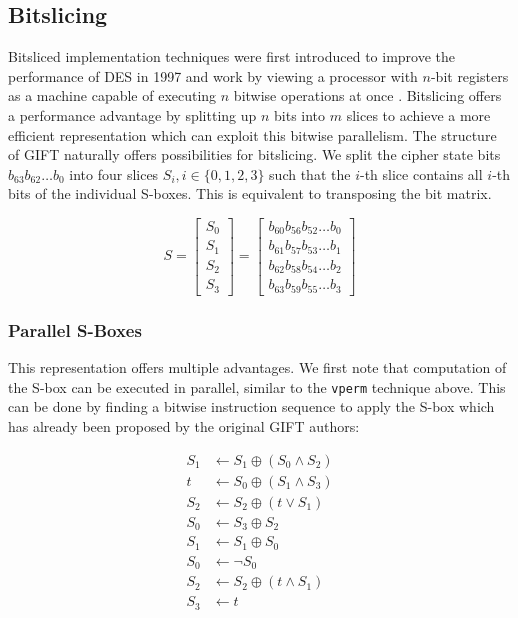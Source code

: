 \subsection{Bitslicing}

Bitsliced implementation techniques were first introduced to improve the
performance of DES in 1997 and work by viewing a processor with $n$-bit
registers as a machine capable of executing $n$ bitwise operations at
once \cite{desslicing:1997}. Bitslicing offers a performance advantage by
splitting up $n$ bits into $m$ slices to achieve a more efficient
representation which can exploit this bitwise parallelism. The structure of
GIFT naturally offers possibilities for bitslicing. We split the
cipher state bits $b_{63}b_{62}\dots b_0$ into four slices $S_i,
i\in\{0,1,2,3\}$ such that the $i$-th slice contains all $i$-th bits of the
individual S-boxes. This is equivalent to transposing the bit matrix.

\[
    S=\begin{bmatrix}
        S_0\\
        S_1\\
        S_2\\
        S_3
    \end{bmatrix}
    =\begin{bmatrix}
        b_{60}b_{56}b_{52}\dots b_0\\
        b_{61}b_{57}b_{53}\dots b_1\\
        b_{62}b_{58}b_{54}\dots b_2\\
        b_{63}b_{59}b_{55}\dots b_3
    \end{bmatrix}
\]

\subsubsection{Parallel S-Boxes}

This representation offers multiple advantages. We first note that computation
of the S-box can be executed in parallel, similar to the \texttt{vperm}
technique above. This can be done by finding a bitwise instruction sequence to
apply the S-box which has already been proposed by the original GIFT authors:

\begin{align*}
    S_1&\leftarrow S_1\oplus (S_0\land S_2) \\
    t&\leftarrow S_0\oplus (S_1\land S_3) \\
    S_2&\leftarrow S_2\oplus (t\lor S_1) \\
    S_0&\leftarrow S_3\oplus S_2 \\
    S_1&\leftarrow S_1\oplus S_0 \\
    S_0&\leftarrow \lnot S_0 \\
    S_2&\leftarrow S_2\oplus (t\land S_1) \\
    S_3&\leftarrow t
\end{align*}

